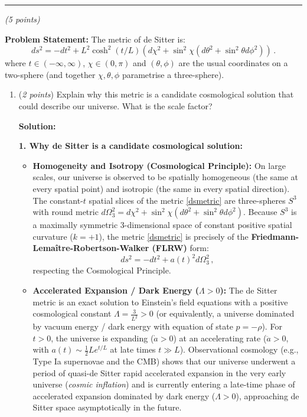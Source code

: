 \documentclass[12pt]{article}
\newcommand{\be}{\begin{equation}}
\newcommand{\ee}{\end{equation}}
\newcounter{quesno}
\newcommand{\ques}[1]{\vspace{2em}\stepcounter{quesno}
\noindent{\bf Question \thequesno.} \emph{(#1 points)\\}
}
\begin{document}
\vspace{1em}
\hrule

\ques{5}
\textbf{Problem Statement:} The metric of de Sitter is:
\be
ds^2 =- dt^2 +  L^2  \cosh^2 (t/L) \left( d\chi^2 + \sin^2 \chi \left( d\theta^2 + \sin^2\theta d\phi^2 \right)\right)  \,.
\label{dsmetric} 
\ee
where $t \in (-\infty, \infty)$, $\chi \in (0,\pi)$ and $(\theta,\phi)$ are the usual coordinates on a two-sphere (and together $\chi, \theta,\phi$ parametrise a three-sphere).

\begin{enumerate}[label=\alph*)]
\item (\emph{2 points})  Explain why this metric is a candidate cosmological solution that could describe our universe. What is the scale factor?  

\medskip
\noindent\textbf{Solution:}

\noindent\textbf{1. Why de Sitter is a candidate cosmological solution:}
\begin{itemize}
\item \textbf{Homogeneity and Isotropy (Cosmological Principle):} On large scales, our universe is observed to be spatially homogeneous (the same at every spatial point) and isotropic (the same in every spatial direction). The constant-$t$ spatial slices of the metric \eqref{dsmetric} are three-spheres $S^3$ with round metric $d\Omega_3^2 = d\chi^2 + \sin^2\chi(d\theta^2 + \sin^2\theta d\phi^2)$. Because $S^3$ is a maximally symmetric 3-dimensional space of constant positive spatial curvature ($k = +1$), the metric \eqref{dsmetric} is precisely of the \textbf{Friedmann-Lema\^{i}tre-Robertson-Walker (FLRW)} form:
\be
ds^2 = -dt^2 + a(t)^2 d\Omega_3^2 \,,
\ee
respecting the Cosmological Principle.
\item \textbf{Accelerated Expansion / Dark Energy ($\Lambda > 0$):} The de Sitter metric is an exact solution to Einstein's field equations with a positive cosmological constant $\Lambda = \frac{3}{L^2} > 0$ (or equivalently, a universe dominated by vacuum energy / dark energy with equation of state $p = -\rho$). For $t > 0$, the universe is expanding ($\dot{a} > 0$) at an accelerating rate ($\ddot{a} > 0$, with $a(t) \sim \frac{1}{2} L e^{t/L}$ at late times $t \gg L$). Observational cosmology (e.g., Type Ia supernovae and the CMB) shows that our universe underwent a period of quasi-de Sitter rapid accelerated expansion in the very early universe (\emph{cosmic inflation}) and is currently entering a late-time phase of accelerated expansion dominated by dark energy ($\Lambda > 0$), approaching de Sitter space asymptotically in the future.
\end{itemize}


\end{enumerate}
\end{document}
